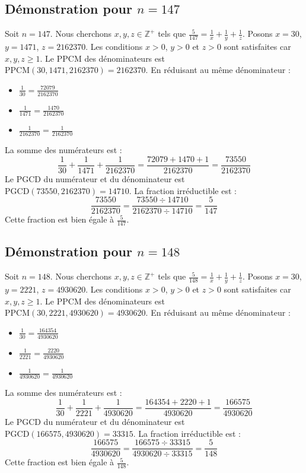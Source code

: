 \documentclass[11pt,a4paper]{article}
\begin{document}
\subsection{Démonstration pour $n = 147$}
Soit $n = 147$. Nous cherchons $x, y, z \in \mathbb{Z}^{+}$ tels que $\frac{5}{147} = \frac{1}{x} + \frac{1}{y} + \frac{1}{z}$.
Posons $x = 30$, $y = 1471$, $z = 2162370$.
Les conditions $x > 0$, $y > 0$ et $z > 0$ sont satisfaites car $x, y, z \geq 1$.
Le PPCM des dénominateurs est $\text{PPCM}(30, 1471, 2162370) = 2162370$.
En réduisant au même dénominateur :
\begin{itemize}
    \item $\frac{1}{30} = \frac{72079}{2162370}$
    \item $\frac{1}{1471} = \frac{1470}{2162370}$
    \item $\frac{1}{2162370} = \frac{1}{2162370}$
\end{itemize}
La somme des numérateurs est :
$$ \frac{1}{30} + \frac{1}{1471} + \frac{1}{2162370} = \frac{72079 + 1470 + 1}{2162370} = \frac{73550}{2162370} $$
Le PGCD du numérateur et du dénominateur est $\text{PGCD}(73550, 2162370) = 14710$.
La fraction irréductible est :
$$ \frac{73550}{2162370} = \frac{73550 \div 14710}{2162370 \div 14710} = \frac{5}{147} $$
Cette fraction est bien égale à $\frac{5}{147}$.

\subsection{Démonstration pour $n = 148$}
Soit $n = 148$. Nous cherchons $x, y, z \in \mathbb{Z}^{+}$ tels que $\frac{5}{148} = \frac{1}{x} + \frac{1}{y} + \frac{1}{z}$.
Posons $x = 30$, $y = 2221$, $z = 4930620$.
Les conditions $x > 0$, $y > 0$ et $z > 0$ sont satisfaites car $x, y, z \geq 1$.
Le PPCM des dénominateurs est $\text{PPCM}(30, 2221, 4930620) = 4930620$.
En réduisant au même dénominateur :
\begin{itemize}
    \item $\frac{1}{30} = \frac{164354}{4930620}$
    \item $\frac{1}{2221} = \frac{2220}{4930620}$
    \item $\frac{1}{4930620} = \frac{1}{4930620}$
\end{itemize}
La somme des numérateurs est :
$$ \frac{1}{30} + \frac{1}{2221} + \frac{1}{4930620} = \frac{164354 + 2220 + 1}{4930620} = \frac{166575}{4930620} $$
Le PGCD du numérateur et du dénominateur est $\text{PGCD}(166575, 4930620) = 33315$.
La fraction irréductible est :
$$ \frac{166575}{4930620} = \frac{166575 \div 33315}{4930620 \div 33315} = \frac{5}{148} $$
Cette fraction est bien égale à $\frac{5}{148}$.
\end{document}
